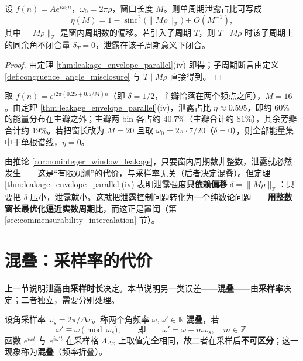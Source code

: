 \begin{proposition}[泄露的同余角刻画]\label{prop:leakage_congruence_angle}
设 $f(n)=Ae^{i\omega_0 n}$，$\omega_0=2\pi\rho$，窗口长度 $M$。则单周期泄露占比可写成
\[
\eta(M)=1-\operatorname{sinc}^2\!\big(\|M\rho\|_{\mathbb{Z}}\big)+O(M^{-1}),
\]
其中 $\|M\rho\|_{\mathbb{Z}}$ 是窗内周期数的偏移。若引入子周期 $T$，则 $T\mid M\rho$ 时该子周期上的同余角不闭合量 $\delta_T=0$，泄露在该子周期意义下闭合。
\end{proposition}

\begin{proof}
由定理 \ref{thm:leakage_envelope_parallel}(iv) 即得；子周期断言由定义 \ref{def:congruence_angle_misclosure} 与 $T\mid M\rho$ 直接得到。
\end{proof}

\begin{example}[泄露的数值量级]\label{ex:rectangular_leakage_numeric}
取 $f(n)=e^{i2\pi(0.25+0.5/M)n}$（即 $\delta=1/2$，主瓣恰落在两个频点之间），$M=16$。由定理 \ref{thm:leakage_envelope_parallel}(iv)，泄露占比 $\eta\approx0.595$，即约 $60\%$ 的能量分布在主瓣之外；主瓣两 bin 各占约 $40.7\%$（主瓣合计约 $81\%$），其余旁瓣合计约 $19\%$。若把窗长改为 $M=20$ 且取 $\omega_0=2\pi\cdot7/20$（$\delta=0$），则全部能量集中于单根谱线，$\eta=0$。
\end{example}

\begin{remark}[泄露的必然性与可控性]\label{rem:leakage_inevitability}
由推论 \ref{cor:noninteger_window_leakage}，只要窗内周期数非整数，泄露就必然发生——这是“有限观测”的代价，与采样率无关（后者决定混叠）。但定理 \ref{thm:leakage_envelope_parallel}(iv) 表明泄露强度\textbf{只依赖偏移} $\delta=\|M\rho\|_{\mathbb{Z}}$：只要把 $\delta$ 压小，泄露就小。这就把泄露控制问题转化为一个纯数论问题——\textbf{用整数窗长最优化逼近实数周期比}，而这正是置闰（第 \ref{sec:commensurability_intercalation} 节）。
\end{remark}

\section{混叠：采样率的代价}\label{sec:aliasing}

上一节说明泄露由\textbf{采样时长}决定。本节说明另一类误差——\textbf{混叠}——由\textbf{采样率}决定；二者独立，需要分别处理。

\begin{definition}[混叠]\label{def:aliasing_parallel}
设角采样率 $\omega_s=2\pi/\Delta x$。称两个角频率 $\omega,\omega'\in\mathbb{R}$ \textbf{混叠}，若
\[
\omega'\equiv\omega\pmod{\omega_s},
\qquad\text{即}\qquad
\omega'=\omega+m\omega_s,\quad m\in\mathbb{Z}.
\]
函数 $e^{i\omega t}$ 与 $e^{i\omega' t}$ 在采样格 $\Lambda_{\Delta x}$ 上取值完全相同，故二者在采样后\textbf{不可区分}；这一现象称为\textbf{混叠}（频率折叠）。
\end{definition}

